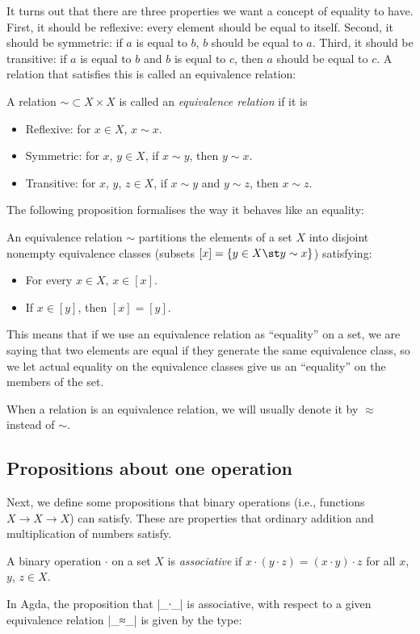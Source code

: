 It turns out that there are three properties we want a concept of equality to have. First, it should be reflexive: every element should be equal to itself. Second, it should be symmetric: if $a$ is equal to $b$, $b$ should be equal to $a$. Third, it should be transitive: if $a$ is equal to $b$ and $b$ is equal to $c$, then $a$ should be equal to $c$. A relation that satisfies this is called an equivalence relation:
\begin{Definition}
  A relation $\mathbin{\sim} \subset X \times X$ is called an \emph{equivalence relation} if it is
  \begin{itemize}
  \item Reflexive: for $x \in X$, $x \sim x$.
  \item Symmetric: for $x$, $y \in X$, if $x \sim y$, then $y \sim x$.
  \item Transitive: for $x$, $y$, $z \in X$, if $x \sim y$ and $y \sim z$, then $x \sim z$.
  \end{itemize}
\end{Definition}
The following proposition formalises the way it behaves like an equality:%
\begin{Proposition}
An equivalence relation $\sim$ partitions the elements of a set $X$ into disjoint nonempty equivalence classes (subsets $[x] = \{y \in X \st y \sim x\}$) satisfying: 
\begin{itemize}
\item For every $x \in X$, $x \in [x]$.
\item If $x \in [y]$, then $[x] = [y]$.
\end{itemize}
\end{Proposition}
This means that if we use an equivalence relation as ``equality'' on a set, we are saying that two elements are equal if they generate the same equivalence class, so we let actual equality on the equivalence classes give us an ``equality'' on the members of the set.

When a relation is an equivalence relation, we will usually denote it by $\approx$ instead of $\sim$.



\subsection{Propositions about one operation}
Next, we define some propositions that binary operations (i.e., functions $X \to X \to X$) can satisfy. These are properties that ordinary addition and multiplication of numbers satisfy.
\begin{Definition} %
A binary operation $\cdot$ on a set $X$ is \emph{associative} if $x \cdot (y \cdot z) = (x \cdot y) \cdot z$ for all $x$, $y$, $z \in X$.
\end{Definition}
In Agda, the proposition that |_∙_| is associative, with respect to a given equivalence relation |_≈_| is given by the type:


